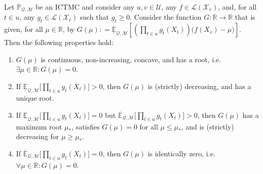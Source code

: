 \documentclass[twoside,11pt]{article}
\makeatletter
\newcommand{\reals}{\mathbb{R}}
\newcommand{\states}{\mathcal{X}}
\newcommand{\lexp}{\underline{\mathbb{E}}_{\rateset,\mathcal{M}}}
\newcommand{\uexp}{\overline{\mathbb{E}}_{\rateset,\mathcal{M}}}
\newcommand{\gambles}{\mathcal{L}}
\newcommand{\rateset}{\mathcal{Q}}
\newcommand{\coloneqq}{:\!=}
\newcommand{\customlabel}[2]{%
   \protected@write \@auxout {}{\string \newlabel {#1}{{#2}{\thepage}{#2}{#1}{}} }%
   \hypertarget{#1}{\emph{#2}\!}
}
\makeatother
\begin{document}
\begin{proposition}\label{prop:GBR_properties}
Let $\mathbb{P}_{\rateset,\mathcal{M}}$ be an ICTMC and consider any $u,v\in\mathcal{U}$, any $f\in\gambles(\states_v)$, and, for all $t\in u$, any $g_{t}\in\gambles(\states_{t})$ such that $g_{t}\geq 0$. 
Consider the function $G: \reals\to\reals$ that is given, for all $\mu\in\reals$, by $G(\mu)\coloneqq \lexp\left[\left(\prod_{t\in u} g_{t}(X_{t})\right)\bigl(f(X_v) - \mu\bigr)\right]$.
%
%
%
Then the following properties hold: \vspace{-2pt}
\begin{enumerate}[label=G\arabic*:,ref=G\arabic*]
\item $G(\mu)$ is continuous, non-increasing, concave, and has a root, i.e. $\exists \mu\in\reals:G(\mu)=0$. \label{GBR:always} \vspace{-3pt}
\item If $\lexp\bigl[\prod_{t\in u} g_{t}(X_{t})\bigr] >0$, then $G(\mu)$ is (strictly) decreasing, and has a unique root. \label{GBR:low_pos} \vspace{-3pt}
\item If $\lexp\bigl[\prod_{t\in u} g_{t}(X_{t})\bigr]=0$ but $\uexp\bigl[\prod_{t\in u} g_{t}(X_{t})\bigr] >0$, then $G(\mu)$ has a maximum root $\mu_*$, satisfies $G(\mu)=0$ for all $\mu\leq \mu_*$, and is (strictly) decreasing for $\mu\geq \mu_*$. \label{GBR:up_pos} \vspace{-3pt}
\item If $\uexp\bigl[\prod_{t\in u} g_{t}(X_{t})\bigr]=0$, then $G(\mu)$ is identically zero, i.e. $\forall \mu\in\reals: G(\mu)=0$. \label{GBR:none_pos}
\end{enumerate}


\end{proposition}
\end{document}
